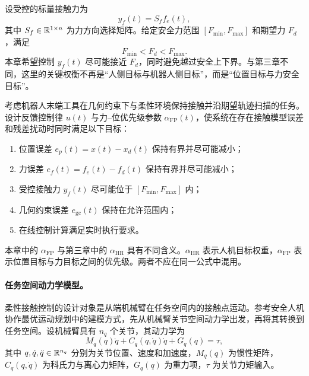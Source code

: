设受控的标量接触力为
\begin{equation}
  y_f(t)=S_f f_e(t),
  \label{eq:ch4_yf}
\end{equation}
其中 $S_f\in\mathbb{R}^{1\times n}$ 为力方向选择矩阵。给定安全力范围 $[F_{\min},F_{\max}]$ 和期望力 $F_d$，满足
\begin{equation}
  F_{\min}<F_d<F_{\max} .
  \label{eq:ch4_force_band}
\end{equation}
本章希望控制 $y_f(t)$ 尽可能接近 $F_d$，同时避免越过安全上下界。与第三章不同，这里的关键权衡不再是“人侧目标与机器人侧目标”，而是“位置目标与力安全目标”。

\begin{problem}
\label{prob:ch4_force_position}
考虑机器人末端工具在几何约束下与柔性环境保持接触并沿期望轨迹扫描的任务。设计反馈控制律 $u(t)$ 与力--位优先级参数 $\alpha_{\mathrm{FP}}(t)$，使系统在存在接触模型误差和残差扰动时同时满足以下目标：
\begin{enumerate}[label=(\arabic*)]
  \item 位置误差 $e_p(t)=x(t)-x_d(t)$ 保持有界并尽可能减小；
  \item 力误差 $e_f(t)=f_e(t)-f_d(t)$ 保持有界并尽可能减小；
  \item 受控接触力 $y_f(t)$ 尽可能位于 $[F_{\min},F_{\max}]$ 内；
  \item 几何约束误差 $e_{\mathrm{gc}}(t)$ 保持在允许范围内；
  \item 在线控制计算满足实时执行要求。
\end{enumerate}
\end{problem}

\begin{remark}
本章中的 $\alpha_{\mathrm{FP}}$ 与第三章中的 $\alpha_{\mathrm{HR}}$ 具有不同含义。$\alpha_{\mathrm{HR}}$ 表示人机目标权重，$\alpha_{\mathrm{FP}}$ 表示位置目标与力目标之间的优先级。两者不应在同一公式中混用。
\end{remark}


\paragraph{任务空间动力学模型。}
\label{subsec:ch4_robot_dynamics}

柔性接触控制的设计对象是从端机械臂在任务空间内的接触点运动。参考安全人机协作最优运动规划中的建模方式，先从机械臂关节空间动力学出发，再将其转换到任务空间\cite{li2025optimal}。设机械臂具有 $n_q$ 个关节，其动力学为
\begin{equation}
  M_q(q)\ddot q+C_q(q,\dot q)\dot q+G_q(q)=\tau,
  \label{eq:ch4_joint_dynamics}
\end{equation}
其中 $q,\dot q,\ddot q\in\mathbb{R}^{n_q}$ 分别为关节位置、速度和加速度，$M_q(q)$ 为惯性矩阵，$C_q(q,\dot q)$ 为科氏力与离心力矩阵，$G_q(q)$ 为重力项，$\tau$ 为关节力矩输入。

